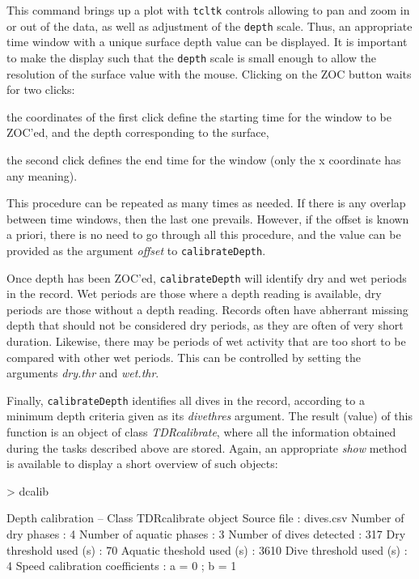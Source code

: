 \documentclass[12pt, letterpaper]{scrartcl}
\newcommand{\Robject}[1]{{\texttt{#1}}}
\newcommand{\Rfunction}[1]{{\texttt{#1}}}
\newcommand{\Rpackage}[1]{{\texttt{#1}}}
\newcommand{\Rclass}[1]{{\textit{#1}}}
\newcommand{\Rmethod}[1]{{\textit{#1}}}
\newcommand{\Rfunarg}[1]{{\textit{#1}}}
\begin{document}
This command brings up a plot with \Rpackage{tcltk} controls allowing to
pan and zoom in or out of the data, as well as adjustment of the
\Robject{depth} scale.  Thus, an appropriate time window with a unique
surface depth value can be displayed.  It is important to make the display
such that the \Robject{depth} scale is small enough to allow the
resolution of the surface value with the mouse.  Clicking on the ZOC
button waits for two clicks:
\begin{compactenum}
\item the coordinates of the first click define the starting time for the
  window to be ZOC'ed, and the depth corresponding to the surface,
\item the second click defines the end time for the window (only the x
  coordinate has any meaning).
\end{compactenum}
This procedure can be repeated as many times as needed.  If there is any
overlap between time windows, then the last one prevails.  However, if the
offset is known a priori, there is no need to go through all this
procedure, and the value can be provided as the argument \Rfunarg{offset}
to \Rfunction{calibrateDepth}.

Once depth has been ZOC'ed, \Rfunction{calibrateDepth} will identify dry
and wet periods in the record.  Wet periods are those where a depth
reading is available, dry periods are those without a depth reading.
Records often have abherrant missing depth that should not be considered
dry periods, as they are often of very short duration.  Likewise, there
may be periods of wet activity that are too short to be compared with
other wet periods.  This can be controlled by setting the arguments
\Rfunarg{dry.thr} and \Rfunarg{wet.thr}.

Finally, \Rfunction{calibrateDepth} identifies all dives in the record,
according to a minimum depth criteria given as its \Rfunarg{divethres}
argument.  The result (value) of this function is an object of class
\Rclass{TDRcalibrate}, where all the information obtained during the tasks
described above are stored.  Again, an appropriate \Rmethod{show} method
is available to display a short overview of such objects:
\begin{Schunk}
\begin{Sinput}
> dcalib
\end{Sinput}
\begin{Soutput}
Depth calibration -- Class TDRcalibrate object
  Source file                       : dives.csv 
  Number of dry phases              : 4 
  Number of aquatic phases          : 3 
  Number of dives detected          : 317 
  Dry threshold used (s)            : 70 
  Aquatic theshold used (s)         : 3610 
  Dive threshold used (s)           : 4 
  Speed calibration coefficients    : a = 0 ; b = 1 
\end{Soutput}
\end{Schunk}
\end{document}
